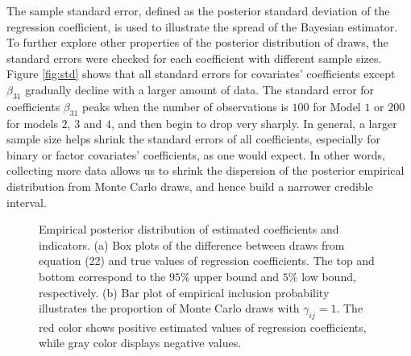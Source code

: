 \documentclass[twoside,11pt]{article}
\begin{document}
The sample standard error, defined as the posterior standard deviation of the regression coefficient, is used to illustrate the spread of the Bayesian estimator. 
To further explore other properties of the posterior distribution of draws, the standard errors were checked for each coefficient with different sample sizes. Figure \ref{fig:std} shows that all standard errors for covariates' coefficients except $\beta_{31}$ gradually decline with a larger amount of data. The standard error for coefficients $\beta_{31}$ peaks when the number of observations is $100$ for Model $1$ or $200$ for models $2$, $3$ and $4$, and then begin to drop very sharply. In general, a larger sample size helps shrink the standard errors of all coefficients, especially for binary or factor covariates' coefficients, as one would expect. In other words, collecting more data allows us to shrink the dispersion of the posterior empirical distribution from Monte Carlo draws, and hence build a narrower credible interval.
\begin{figure}[h]
	\caption{Empirical posterior distribution of estimated coefficients and indicators. (a) Box plots of the difference between draws from equation (22) and true values of regression coefficients. The top and bottom correspond to the $95\%$ upper bound and $5\%$ low bound, respectively. (b) Bar plot of empirical inclusion probability illustrates the proportion of Monte Carlo draws with $\gamma_{ij}=1$. The red color shows positive estimated values of regression coefficients, while gray color displays negative values.}
	\label{Dis-inc}
\end{figure}
\end{document}
